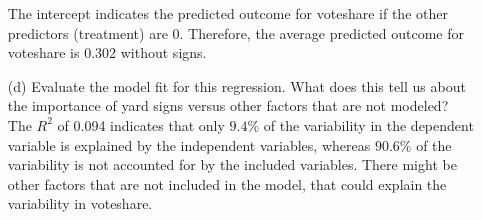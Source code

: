 \documentclass[12pt,letterpaper]{article}
\begin{document}
\begin{enumerate}
	The intercept indicates the predicted outcome for voteshare if the other predictors (treatment) are 0. Therefore, the average predicted outcome for voteshare is 0.302 without signs.
	\vspace{2cm}
	
	\item [(d)] Evaluate the model fit for this regression.  What does this	tell us about the importance of yard signs versus other factors that are not modeled?\\
	
	The $R^2$ of 0.094 indicates that only $9.4\%$ of the variability in the dependent variable is explained by the independent variables, whereas $90.6\%$ of the variability is not accounted for by the included variables. There might be other factors that are not included in the model, that could  explain the variability in voteshare. 
	
\end{enumerate}  
\end{document}
